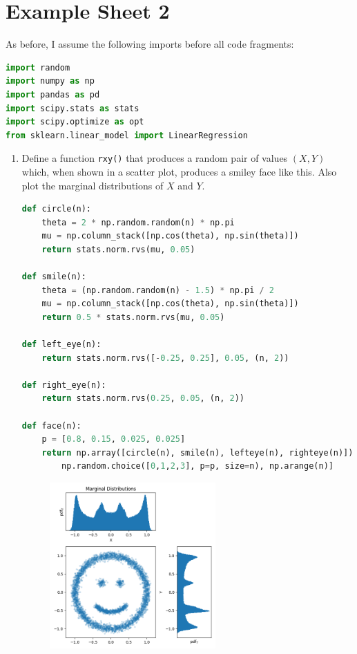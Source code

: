 \documentclass[10pt,\jkfside,a4paper]{article}
\begin{document}
\section{Example Sheet 2}

As before, I assume the following imports before all code fragments:
\begin{lstlisting}[language=Python]
import random
import numpy as np
import pandas as pd
import scipy.stats as stats
import scipy.optimize as opt
from sklearn.linear_model import LinearRegression
\end{lstlisting}

\begin{enumerate}

\item Define a function \texttt{rxy()} that produces a random pair of values
$(X, Y)$ which, when shown in a scatter plot, produces a smiley face like
this. Also plot the marginal distributions of $X$ and $Y$.

\begin{lstlisting}[language=Python]
def circle(n):
	theta = 2 * np.random.random(n) * np.pi
	mu = np.column_stack([np.cos(theta), np.sin(theta)])
	return stats.norm.rvs(mu, 0.05)

def smile(n):
	theta = (np.random.random(n) - 1.5) * np.pi / 2
	mu = np.column_stack([np.cos(theta), np.sin(theta)])
	return 0.5 * stats.norm.rvs(mu, 0.05)

def left_eye(n):
	return stats.norm.rvs([-0.25, 0.25], 0.05, (n, 2))

def right_eye(n):
	return stats.norm.rvs(0.25, 0.05, (n, 2))

def face(n):
	p = [0.8, 0.15, 0.025, 0.025]
	return np.array([circle(n), smile(n), lefteye(n), righteye(n)])[
		np.random.choice([0,1,2,3], p=p, size=n), np.arange(n)]

\end{lstlisting}

\begin{figure}[H]
\centering
\includegraphics[width=0.6\textwidth]{./smiley_marginal_distribution}
\end{figure}


\end{enumerate}
\end{document}
